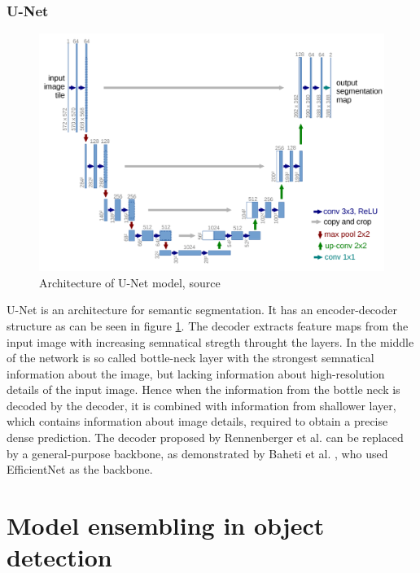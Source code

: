 \subsubsection{U-Net}
\begin{figure}
    \centering
    \includegraphics[width=\linewidth]{images/U-Net.png}
    \caption{Architecture of U-Net model, source \cite{Ronneberger2015}}
    \label{fig:unet_architecture}
\end{figure}
U-Net is an architecture for semantic segmentation. It has an encoder-decoder structure as can be seen in figure \ref{fig:unet_architecture}. The decoder extracts feature maps from the input image with increasing semnatical stregth throught the layers. In the middle of the network is so called bottle-neck layer with the strongest semnatical information about the image, but lacking information about high-resolution details of the input image. Hence when the information from the bottle neck is decoded by the decoder, it is combined with information from shallower layer, which contains information about image details, required to obtain a precise dense prediction.
\newline
The decoder proposed by Rennenberger et al. \cite{Ronneberger2015} can be replaced by a general-purpose backbone, as demonstrated by Baheti et al. \cite{Baheti2020}, who used EfficientNet as the backbone.

\section{Model ensembling in object detection}

